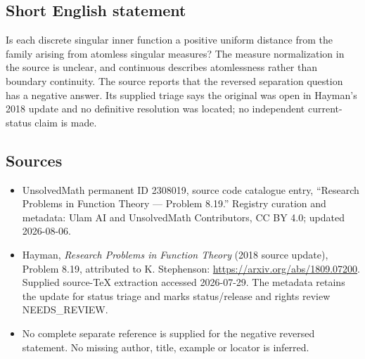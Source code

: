 \documentclass[11pt]{article}
\begin{document}
\subsection{Short English statement}
Is each discrete singular inner function a positive uniform distance from the family arising from atomless singular measures? The measure normalization in the source is unclear, and continuous describes atomlessness rather than boundary continuity. The source reports that the reversed separation question has a negative answer. Its supplied triage says the original was open in Hayman's 2018 update and no definitive resolution was located; no independent current-status claim is made.
\subsection{Sources}
\begin{itemize}
\item UnsolvedMath permanent ID 2308019, source code catalogue entry, ``Research Problems in Function Theory --- Problem 8.19.'' Registry curation and metadata: Ulam AI and UnsolvedMath Contributors, CC BY 4.0; updated 2026-08-06.
\item Hayman, \emph{Research Problems in Function Theory} (2018 source update), Problem 8.19, attributed to K. Stephenson: \url{https://arxiv.org/abs/1809.07200}. Supplied source-TeX extraction accessed 2026-07-29. The metadata retains the update for status triage and marks status/release and rights review NEEDS\_REVIEW.
\item No complete separate reference is supplied for the negative reversed statement. No missing author, title, example or locator is inferred.
\end{itemize}
\end{document}
